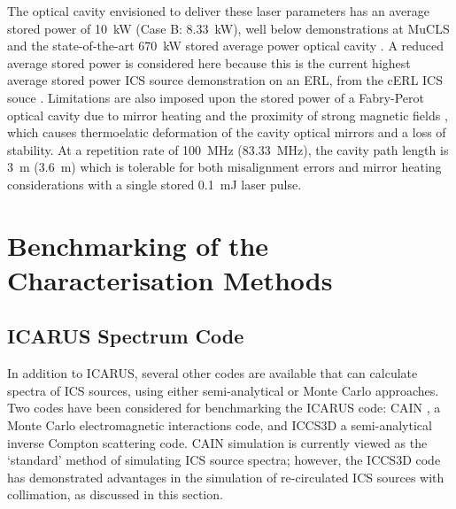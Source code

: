 \documentclass[../main.tex]{subfiles}
\begin{document}
The optical cavity envisioned to deliver these laser parameters has an average stored power of 10~\si{\kilo\watt} (Case B: 8.33~\si{\kilo\watt}), well below demonstrations at MuCLS \cite{eggl2016munich} and the state-of-the-art 670~\si{\kilo\watt} stored average power optical cavity \cite{carstens2014megawatt}. A reduced average stored power is considered here because this is the current highest average stored power ICS source demonstration on an ERL, from the cERL ICS souce \cite{akagi2016narrow}. Limitations are also imposed upon the stored power of a Fabry-Perot optical cavity due to mirror heating \cite{chaikovska2016high} and the proximity of strong magnetic fields \cite{gunther2019device}, which causes thermoelatic deformation of the cavity optical mirrors and a loss of stability. At a repetition rate of 100~\si{\mega\hertz} (83.33~\si{\mega\hertz}), the cavity path length is 3~\si{\meter} (3.6~\si{\meter})  which is tolerable for both misalignment errors \cite{zomer2009polarization} and mirror heating considerations with a single stored 0.1~\si{\milli\joule} laser pulse.  

\section{Benchmarking of the Characterisation Methods}
\label{sec:benchmarking_of_the_characterisation_methods}

\subsection{ICARUS Spectrum Code}
\label{sec:ICARUS_benchmarking}

In addition to \textsc{ICARUS}, several other codes are available that can calculate spectra of ICS sources, using either semi-analytical or Monte Carlo approaches. Two codes have been considered for benchmarking the \textsc{ICARUS} code: \textsc{CAIN} \cite{chen1995cain}, a Monte Carlo electromagnetic interactions code, and \textsc{ICCS3D} a semi-analytical inverse Compton scattering code. \textsc{CAIN} simulation is currently viewed as the `standard' method of simulating ICS source spectra; however, the \textsc{ICCS3D} code has demonstrated advantages in the simulation of re-circulated ICS sources with collimation, as discussed in this section. 
\end{document}
